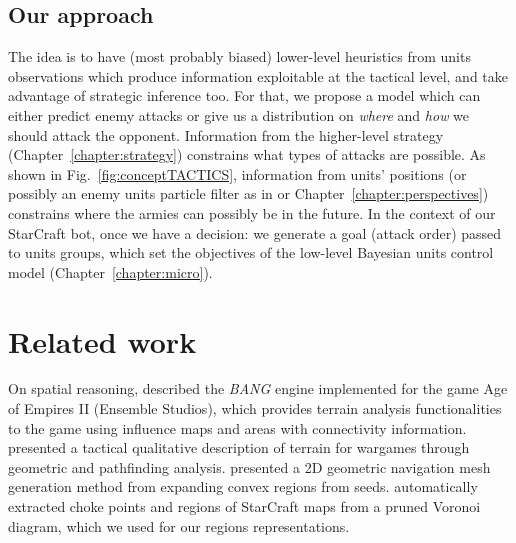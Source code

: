 \subsection{Our approach}
The idea is to have (most probably biased) lower-level heuristics from units observations which produce information exploitable at the tactical level, and take advantage of strategic inference too. 
For that, we propose a model which can either predict enemy attacks or give us a distribution on \textit{where} and \textit{how} we should attack the opponent. Information from the higher-level strategy \citep{SYNNAEVE:StratPred,SYNNAEVE:OpeningPred} (Chapter~\ref{chapter:strategy}) constrains what types of attacks are possible. As shown in Fig.~\ref{fig:conceptTACTICS}, information from units' positions (or possibly an enemy units particle filter as in \citep{weber2011aiide} or Chapter~\ref{chapter:perspectives}) constrains where the armies can possibly be in the future. In the context of our StarCraft bot, once we have a decision: we generate a goal (attack order) passed to units groups, which set the objectives of the low-level Bayesian units control model \citep{SYNNAEVE:Micro} (Chapter~\ref{chapter:micro}).



\section{Related work}

On spatial reasoning, \cite{Pottinger00} described the \textit{BANG} engine implemented for the game Age of Empires II (Ensemble Studios), which provides terrain analysis functionalities to the game using influence maps and areas with connectivity information. 
\cite{Forbus2002} presented a tactical qualitative description of terrain for wargames through geometric and pathfinding analysis. \cite{Hale08} presented a 2D geometric navigation mesh generation method from expanding convex regions from seeds. \cite{Perkins2010} automatically extracted choke points and regions of StarCraft maps from a pruned Voronoi diagram, which we used for our regions representations. 

